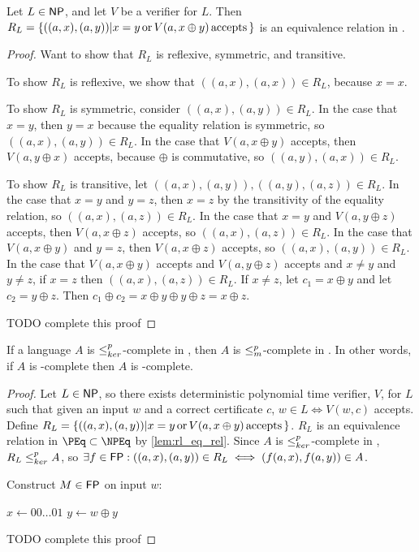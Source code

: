 \begin{lemma}\label{lem:rl_eq_rel}Let $L\in{\ensuremath{\mathsf{NP}}}$, and let $V$ be a verifier for
  $L$. Then $R_L=\{((a,x),(a,y))|x=y\,\text{or}\,V(a,x\oplus y)\,\text{accepts}\,\}$
  is an equivalence relation in \PEq.\end{lemma}
\begin{proof}Want to show that $R_L$ is reflexive, symmetric, and transitive.
  
  To show $R_L$ is reflexive, we show that $((a,x),(a,x))\in R_L$, because
  $x=x$.

  To show $R_L$ is symmetric, consider $((a,x),(a,y))\in R_L$. In the case that
  $x=y$, then $y=x$ because the equality relation is symmetric, so
  $((a,x),(a,y))\in R_L$. In the case that $V(a,x\oplus y)$ accepts, then
  $V(a,y\oplus x)$ accepts, because $\oplus$ is commutative, so
  $((a,y),(a,x))\in R_L$.

  To show $R_L$ is transitive, let $((a,x),(a,y)),((a,y),(a,z))\in R_L$. In the
  case that $x=y$ and $y=z$, then $x=z$ by the transitivity of the equality
  relation, so $((a,x),(a,z))\in R_L$. In the case that $x=y$ and $V(a, y\oplus
  z)$ accepts, then $V(a, x\oplus z)$ accepts, so $((a,x),(a,z))\in R_L$. In
  the case that $V(a, x\oplus y)$ and $y=z$, then $V(a, x\oplus z)$ accepts, so
  $((a,x), (a,y))\in R_L$. In the case that $V(a, x\oplus y)$ accepts and $V(a,
  y\oplus z)$ accepts and $x\neq y$ and $y\neq z$, if $x=z$ then
  $((a,x),(a,z))\in R_L$. If $x\neq z$, let $c_1=x\oplus y$ and let
  $c_2=y\oplus z$. Then $c_1\oplus c_2=x\oplus y\oplus y\oplus z=x\oplus z$.

  TODO complete this proof
\end{proof}

\begin{theorem}\label{thm:krc_npc}If a language $A$ is $\leq^{p}_{ker}$-complete in \NPEq,
  then $A$ is $\leq^{p}_{m}$-complete in \NP. In other words, if $A$ is \NPEq-complete
  then $A$ is \NP-complete.\end{theorem}
\begin{proof}
  Let $L\in{\ensuremath{\mathsf{NP}}}$, so there exists deterministic polynomial time verifier, $V$,
  for $L$ such that given an input $w$ and a correct certificate $c$, $w\in
  L\iff V(w,c)$ accepts. Define $R_L=\{((a, x),(a, y))|x=y \,\text{or}\, V(a,
  x\oplus y) \,\text{accepts}\,\}$. $R_L$ is an equivalence relation in
  $\PEq\subset\NPEq$ by \autoref{lem:rl_eq_rel}. Since $A$ is $\leq^{p}_{ker}$-complete in
  \NPEq, $R_L\leq^{p}_{ker} A$, so $\exists f\in{\ensuremath{\mathsf{FP}}}:((a,x),(a,y))\in R_L\iff (f(a,x),
  f(a,y))\in A$.

  Construct $M\in{\ensuremath{\mathsf{FP}}}$ on input $w$:\\
  \begin{algorithm}[H]
    $x\gets00\ldots01$\;
    $y\gets w\oplus y$\;
  \end{algorithm}

  

  TODO complete this proof
\end{proof}

